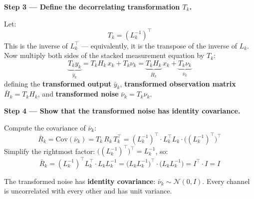 \documentclass[12pt, a4paper]{article}
\begin{document}
\textbf{Step 3 --- Define the decorrelating transformation $T_k$.}

Let:
\[
  T_k = (L_k^{-1})^\top
\]
This is the inverse of $L_k^\top$ --- equivalently, it is the transpose
of the inverse of $L_k$.
Now multiply both sides of the stacked measurement equation by $T_k$:
\[
  \underbrace{T_k y_k}_{\bar{y}_k}
  = T_k H_k\, x_k + T_k \nu_k
  = \underbrace{T_k H_k}_{\bar{H}_k}\, x_k
    + \underbrace{T_k \nu_k}_{\bar{\nu}_k}
\]
defining the \textbf{transformed output} $\bar{y}_k$,
\textbf{transformed observation matrix} $\bar{H}_k = T_k H_k$,
and \textbf{transformed noise} $\bar{\nu}_k = T_k \nu_k$.

\textbf{Step 4 --- Show that the transformed noise has identity covariance.}

Compute the covariance of $\bar{\nu}_k$:
\[
  \bar{R}_k
  = \mathrm{Cov}(\bar{\nu}_k)
  = T_k\, R_k\, T_k^\top
  = (L_k^{-1})^\top \cdot L_k^\top L_k \cdot \bigl((L_k^{-1})^\top\bigr)^\top
\]
Simplify the rightmost factor: $\bigl((L_k^{-1})^\top\bigr)^\top = L_k^{-1}$,
so:
\[
  \bar{R}_k
  = (L_k^{-1})^\top L_k^\top \cdot L_k L_k^{-1}
  = \bigl(L_k L_k^{-1}\bigr)^\top \cdot \bigl(L_k L_k^{-1}\bigr)
  = I^\top \cdot I
  = I
\]

The transformed noise has \textbf{identity covariance}: $\bar{\nu}_k \sim
\mathcal{N}(0, I)$.
Every channel is uncorrelated with every other and has unit variance.
\end{document}
